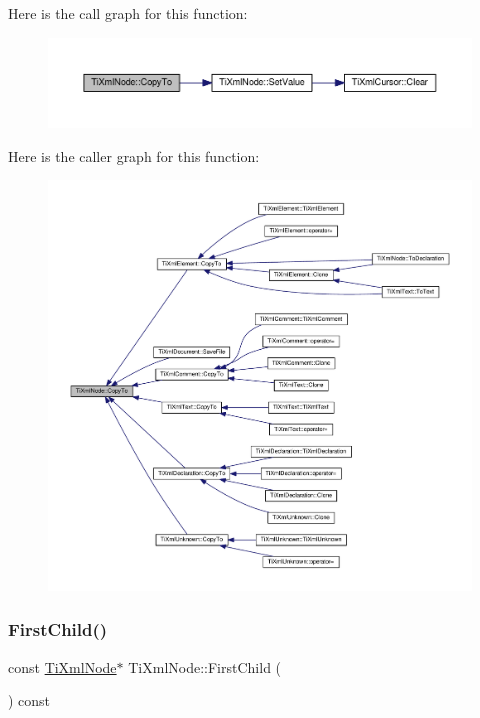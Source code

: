 Here is the call graph for this function\+:
\nopagebreak
\begin{figure}[H]
\begin{center}
\leavevmode
\includegraphics[width=350pt]{class_ti_xml_node_aaadd5bb9c94f84c4472b649b95de4a0b_cgraph}
\end{center}
\end{figure}
Here is the caller graph for this function\+:
\nopagebreak
\begin{figure}[H]
\begin{center}
\leavevmode
\includegraphics[width=350pt]{class_ti_xml_node_aaadd5bb9c94f84c4472b649b95de4a0b_icgraph}
\end{center}
\end{figure}
\mbox{\label{class_ti_xml_node_aa66bceae19707c90c1db12d7c98894a4}} 
\subsubsection{\texorpdfstring{First\+Child()}{FirstChild()}\hspace{0.1cm}{\footnotesize\ttfamily [1/4]}}
{\footnotesize\ttfamily const \hyperlink{class_ti_xml_node}{Ti\+Xml\+Node}$\ast$ Ti\+Xml\+Node\+::\+First\+Child (\begin{DoxyParamCaption}{ }\end{DoxyParamCaption}) const\hspace{0.3cm}{\ttfamily [inline]}}



